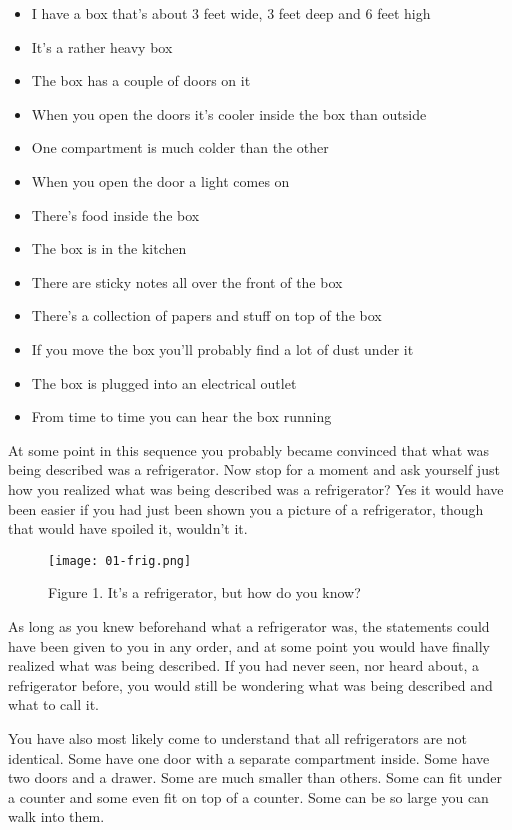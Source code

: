 \documentclass[]{memoir}
\makeatletter
\def\maxwidth{\ifdim\Gin@nat@width>\linewidth\linewidth
\else\Gin@nat@width\fi}
\let\Oldincludegraphics\includegraphics
\renewcommand{\includegraphics}[1]{\Oldincludegraphics[width=\maxwidth]{#1}}
\makeatother
\begin{document}
\begin{itemize}
\itemsep1pt\parskip0pt
\item
  I have a box that's about 3 feet wide, 3 feet deep and 6 feet high
\item
  It's a rather heavy box
\item
  The box has a couple of doors on it
\item
  When you open the doors it's cooler inside the box than outside
\item
  One compartment is much colder than the other
\item
  When you open the door a light comes on
\item
  There's food inside the box
\item
  The box is in the kitchen
\item
  There are sticky notes all over the front of the box
\item
  There's a collection of papers and stuff on top of the box
\item
  If you move the box you'll probably find a lot of dust under it
\item
  The box is plugged into an electrical outlet
\item
  From time to time you can hear the box running
\end{itemize}

At some point in this sequence you probably became convinced that what
was being described was a refrigerator. Now stop for a moment and ask
yourself just how you realized what was being described was a
refrigerator? Yes it would have been easier if you had just been shown
you a picture of a refrigerator, though that would have spoiled it,
wouldn't it.

\begin{figure}[htbp]
\centering
\texttt{[image: 01-frig.png]}
\caption{Figure 1. It's a refrigerator, but how do you know?}
\end{figure}

As long as you knew beforehand what a refrigerator was, the statements
could have been given to you in any order, and at some point you would
have finally realized what was being described. If you had never seen,
nor heard about, a refrigerator before, you would still be wondering
what was being described and what to call it.

You have also most likely come to understand that all refrigerators are
not identical. Some have one door with a separate compartment inside.
Some have two doors and a drawer. Some are much smaller than others.
Some can fit under a counter and some even fit on top of a counter. Some
can be so large you can walk into them.
\end{document}
